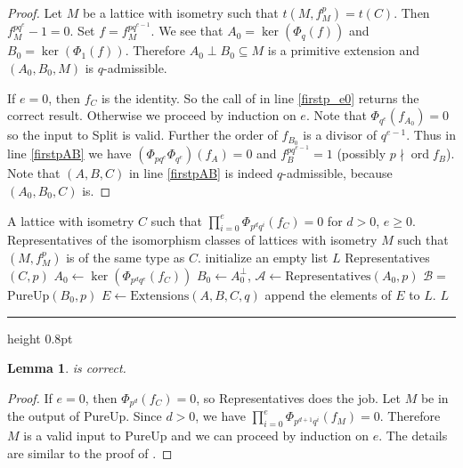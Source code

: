 \documentclass[a4paper]{amsart}
\makeatletter
\theoremstyle{definition}
\theoremstyle{plain}
\newtheorem{lemma}[definition]{Lemma}
\DeclareMathOperator{\ord}{ord}
\newcommand{\B}{\mathcal{B}}
\newcommand{\A}{\mathcal{A}}
\def\hrulefill{\leavevmode\leaders\hrule height 0.8pt\hfill\kern\z@}
\makeatother
\begin{document}
\begin{proof}
Let $M$ be a lattice with isometry such that $t(M,f_M^p)=t(C)$. Then $f_M^{pq^e}-1=0$.
Set $f=f_M^{pq^{e-1}}$. We see that $A_0= \ker(\Phi_q(f))$
and $B_0 = \ker(\Phi_1(f))$. Therefore $A_0 \perp B_0 \subseteq M$ is a primitive extension
and $(A_0,B_0,M)$ is $q$-admissible.

If $e=0$, then $f_C$ is the identity. So the call of  in line \ref{firstp_e0} returns the correct result.
Otherwise we proceed by induction on $e$. Note that $\Phi_{q^e}(f_{A_0})= 0$ so
the input to Split is valid. Further the order of $f_{B_0}$ is a divisor of $q^{e-1}$. Thus in line \ref{firstpAB} we have $(\Phi_{pq^e}\Phi_{q^e})(f_A)=0$
and $f_B^{pq^{e-1}} = 1$ (possibly $p \nmid \ord{f_B}$).
  Note that $(A,B,C)$ in line \ref{firstpAB} is indeed $q$-admissible, because $(A_0,B_0,C)$ is.
\end{proof}


\begingroup
{}\label{PureP}
\endgroup
\begin{algorithmic}[1]
\REQUIRE A lattice with isometry $C$ such that $\prod_{i=0}^e\Phi_{p^dq^i}(f_C)=0$ for $d>0$, $e\geq 0$.
\ENSURE Representatives of the isomorphism classes of lattices with isometry $M$ such that $(M,f_M^p)$ is of the same type as $C$.
\STATE initialize an empty list $L$
\RETURN Representatives$(C,p)$
\ENDIF
\STATE $A_0 \gets \ker(\Phi_{p^dq^e}(f_C))$
\STATE $B_0 \gets A_0^\perp$,
\STATE $\A\gets \mbox{Representatives}(A_0,p)$
\STATE $\B = $ PureUp$(B_0,p)$
\FOR{$(A,B) \in \A \times \B$}
    \STATE $E \gets \mbox{Extensions}(A,B,C,q)$
    \STATE append the elements of $E$ to $L$.
\ENDFOR
\RETURN $L$
\end{algorithmic}\hrulefill\\

\begin{lemma}
 is correct.
\end{lemma}
\begin{proof}
If $e=0$, then $\Phi_{p^d}(f_C)=0$, so Representatives does the job.
Let $M$ be in the output of PureUp. Since $d>0$, we have $\prod_{i=0}^e\Phi_{p^{d+1}q^i}(f_M)=0$. Therefore $M$ is a valid input to PureUp and we can proceed by induction on $e$. The details are
similar to the proof of .
\end{proof}
\end{document}
